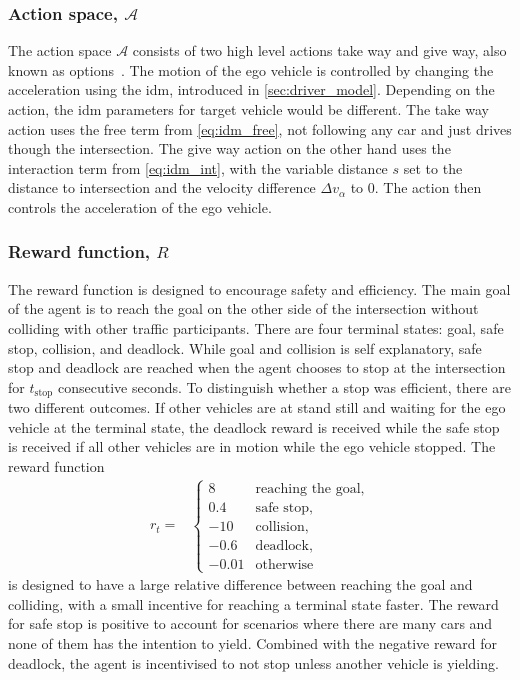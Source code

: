 \subsubsection{Action space, $\mathcal{A}$}
\label{sec:action}
The action space $\mathcal{A}$ consists of two high level actions take way and give way, also known as options~\cite{SUTTON1999}. The motion of the ego vehicle is controlled by changing the acceleration using the \gls{idm}, introduced in \ref{sec:driver_model}. Depending on the action, the \gls{idm} parameters for target vehicle would be different.
The take way action uses the free term from \ref{eq:idm_free}, not following any car and just drives though the intersection. 
The give way action on the other hand uses the interaction term from \ref{eq:idm_int}, with the variable distance $s$ set to the distance to intersection and the velocity difference $\Delta v_\alpha$ to $0$. 
The action then controls the acceleration of the ego vehicle. 

\subsubsection{Reward function, $R$}
\label{sec:reward}
The reward function is designed to encourage safety and efficiency. The main goal of the agent is to reach the goal on the other side of the intersection without colliding with other traffic participants. There are four terminal states: goal, safe stop, collision, and deadlock. While goal and collision is self explanatory, safe stop and deadlock are reached when the agent chooses to stop at the intersection for $t_\mathrm{stop}$ consecutive seconds.
To distinguish whether a stop was efficient, there are two different outcomes. If other vehicles are at stand still and waiting for the ego vehicle at the terminal state, the deadlock reward is received while the safe stop is received if all other vehicles are in motion while the ego vehicle stopped. The reward function 
\begin{align*}
r_t = & \begin{cases}
8 & \text{reaching the goal,}\\
0.4 & \text{safe stop,}\\
-10 & \text{collision},\\
-0.6 & \text{deadlock}, \\
-0.01 & \text{otherwise}
\label{eq:reward}
\end{cases} 
\end{align*}
is designed to have a large relative difference between reaching the goal and colliding, with a small incentive for reaching a terminal state faster. The reward for safe stop is positive to account for scenarios where there are many cars and none of them has the intention to yield. Combined with the negative reward for deadlock, the agent is incentivised to not stop unless another vehicle is yielding. 


